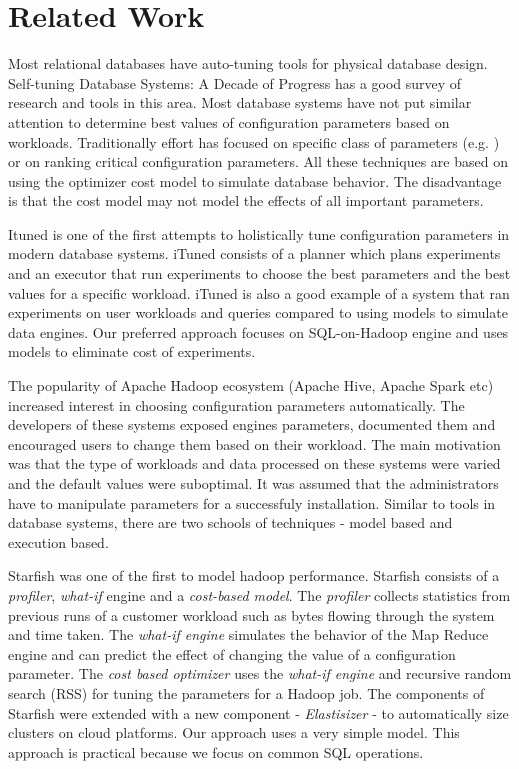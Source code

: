 \section{Related Work}
\label{sec:relatedwork}
Most relational databases have auto-tuning tools for physical database design. 
Self-tuning Database Systems: A Decade of Progress\cite{Chaudhuri:2007:SDS:1325851.1325856}
 has a good survey of research and tools in this area. Most database systems have 
not put similar attention to determine best values of configuration parameters 
based on workloads. Traditionally effort has focused on specific class of parameters 
(e.g.\cite{Storm:2006:ASM:1182635.1164220} ) or on ranking
critical configuration parameters\cite{DBLP:conf/icde/DebnathLM08}. All these techniques
are based on using the optimizer cost model to simulate database behavior. The disadvantage is
that the cost model may not model the effects of all important parameters.

Ituned\cite{Duan:2009:TDC:1687627.1687767} is one of the first attempts to holistically 
tune configuration parameters in modern database systems. iTuned consists of a planner
which plans experiments and an executor that run experiments to choose the best parameters
and the best values for a specific workload. iTuned is also a good example of a system that
ran experiments on user workloads and queries compared to using models to simulate data engines.
Our preferred approach focuses on SQL-on-Hadoop engine and uses models to eliminate cost of experiments.
 
The popularity of Apache Hadoop ecosystem (Apache Hive, Apache Spark etc) increased interest
in choosing configuration parameters automatically. The developers of these systems exposed
engines parameters, documented them and encouraged users to change them based on their workload.
The main motivation was that the type of workloads and data processed on these systems were varied
and the default values were suboptimal. It was assumed that the administrators have to manipulate
parameters for a successfuly installation. Similar to tools in database systems, there are two schools
of techniques - model based and execution based.

Starfish\cite{herodotou2011starfish} was one of the first to model hadoop performance. Starfish 
consists of a \textit{profiler}, \textit{what-if} engine and a \textit{cost-based model}\cite{herodotou2011profiling}. 
The \textit{profiler} collects statistics from previous runs of a customer workload 
such as bytes flowing through the system and time taken. The \textit{what-if engine} simulates 
the behavior of the Map Reduce engine and can predict the effect of changing the value 
of a configuration parameter. The \textit{cost based optimizer} uses the \textit{what-if engine}
and recursive random search (RSS) for tuning the parameters for a Hadoop job. The components of
Starfish were extended with a new component - \textit{Elastisizer}\cite{Herodotou:2011:NOS:2038916.2038934}
- to automatically size clusters on cloud platforms. Our approach uses a very simple model. This approach
is practical because we focus on common SQL operations. 

